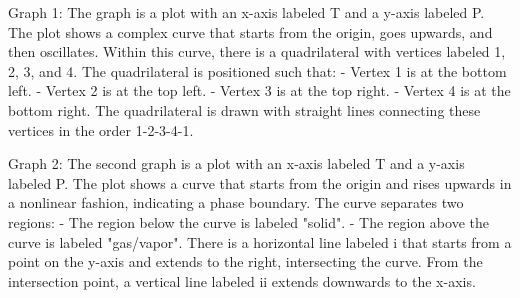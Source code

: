 Graph 1:
The graph is a plot with an x-axis labeled T and a y-axis labeled P. The plot shows a complex curve that starts from the origin, goes upwards, and then oscillates. Within this curve, there is a quadrilateral with vertices labeled 1, 2, 3, and 4. The quadrilateral is positioned such that:
- Vertex 1 is at the bottom left.
- Vertex 2 is at the top left.
- Vertex 3 is at the top right.
- Vertex 4 is at the bottom right.
The quadrilateral is drawn with straight lines connecting these vertices in the order 1-2-3-4-1.

Graph 2:
The second graph is a plot with an x-axis labeled T and a y-axis labeled P. The plot shows a curve that starts from the origin and rises upwards in a nonlinear fashion, indicating a phase boundary. The curve separates two regions:
- The region below the curve is labeled "solid".
- The region above the curve is labeled "gas/vapor".
There is a horizontal line labeled i that starts from a point on the y-axis and extends to the right, intersecting the curve. From the intersection point, a vertical line labeled ii extends downwards to the x-axis.